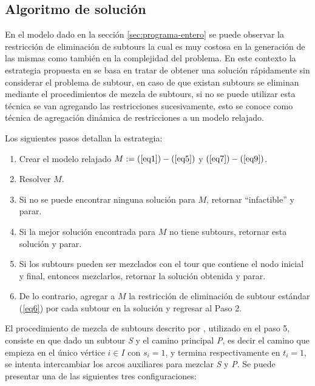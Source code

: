 \subsection{Algoritmo de solución}
\label{algoritmo-solucion}

En el modelo dado en la sección \ref{sec:programa-entero} se puede observar la restricción de eliminación de subtours la cual es muy costosa en la generación de las mismas como también en la complejidad del problema. En este contexto la estrategia propuesta en \citet{Braier2017AnArgentina} se basa en tratar de obtener una solución rápidamente sin considerar el problema de subtour, en caso de que existan subtours se eliminan mediante el procedimientos de mezcla de subtours, si no se puede utilizar esta técnica se van agregando las restricciones sucesivamente, esto se conoce como técnica de agregación dinámica de restricciones a un modelo relajado.

Los siguientes pasos detallan la estrategia:

\begin{enumerate}
\item Crear el modelo relajado $M: = (\ref{eq1}) - (\ref{eq5})$ y $(\ref{eq7}) - (\ref{eq9})$.
\item Resolver $M$.
\item Si no se puede encontrar ninguna solución para $M$, retornar ``infactible'' y parar.
\item Si la mejor solución encontrada para $M$ no tiene subtours, retornar esta solución y parar.
\item Si los subtours pueden ser mezclados con el tour que contiene el nodo inicial y final, entonces mezclarlos, retornar la solución obtenida y parar.
\item De lo contrario, agregar a $M$ la restricción de eliminación de subtour estándar (\ref{eq6}) por cada subtour en la solución y regresar al Paso 2.
\end{enumerate}

El procedimiento de mezcla de subtours descrito por \citet{Braier2017AnArgentina}, utilizado en el paso 5, consiste en que dado un subtour \textit{S} y el camino principal \textit{P}, es decir el camino que empieza en el único vértice $i \in I$ con $s_i = 1$, y termina respectivamente en $t_i = 1$, se intenta intercambiar los arcos auxiliares para mezclar \textit{S} y \textit{P}. Se puede presentar una de las siguientes tres configuraciones:

